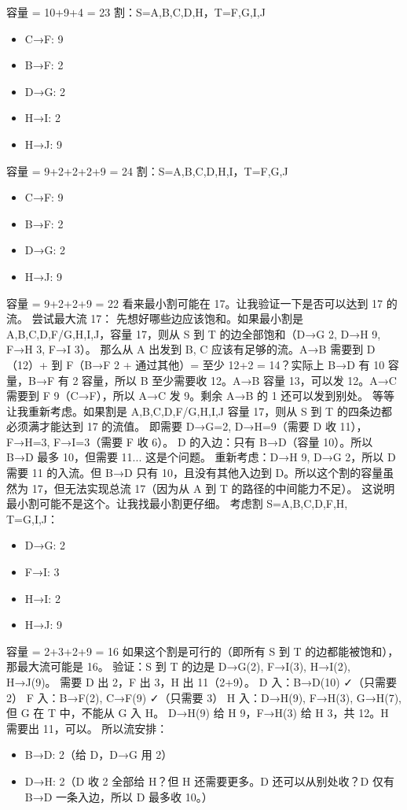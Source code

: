 \documentclass[10pt,a4paper,openany]{ctexbook}
\theoremstyle{definition}
\theoremstyle{remark}
\begin{document}
容量 = 10+9+4 = 23
割：S={A,B,C,D,H}，T={F,G,I,J}
\begin{itemize}
\item C→F: 9
\item B→F: 2
\item D→G: 2
\item H→I: 2
\item H→J: 9
\end{itemize}

容量 = 9+2+2+2+9 = 24
割：S={A,B,C,D,H,I}，T={F,G,J}
\begin{itemize}
\item C→F: 9
\item B→F: 2
\item D→G: 2
\item H→J: 9
\end{itemize}

容量 = 9+2+2+9 = 22
看来最小割可能在 17。让我验证一下是否可以达到 17 的流。
尝试最大流 17：
先想好哪些边应该饱和。如果最小割是 {A,B,C,D,F}/{G,H,I,J}，容量 17，则从 S 到 T 的边全部饱和（D→G 2, D→H 9, F→H 3, F→I 3）。
那么从 A 出发到 B, C 应该有足够的流。A→B 需要到 D（12）+ 到 F（B→F 2 + 通过其他）= 至少 12+2 = 14？实际上 B→D 有 10 容量，B→F 有 2 容量，所以 B 至少需要收 12。A→B 容量 13，可以发 12。A→C 需要到 F 9（C→F），所以 A→C 发 9。剩余 A→B 的 1 还可以发到别处。
等等让我重新考虑。如果割是 {A,B,C,D,F}/{G,H,I,J} 容量 17，则从 S 到 T 的四条边都必须满才能达到 17 的流值。
即需要 D→G=2, D→H=9（需要 D 收 11），F→H=3, F→I=3（需要 F 收 6）。
D 的入边：只有 B→D（容量 10）。所以 B→D 最多 10，但需要 11... 这是个问题。
重新考虑：D→H 9, D→G 2，所以 D 需要 11 的入流。但 B→D 只有 10，且没有其他入边到 D。所以这个割的容量虽然为 17，但无法实现总流 17（因为从 A 到 T 的路径的中间能力不足）。
这说明最小割可能不是这个。让我找最小割更仔细。
考虑割 S={A,B,C,D,F,H}, T={G,I,J}：
\begin{itemize}
\item D→G: 2
\item F→I: 3
\item H→I: 2
\item H→J: 9
\end{itemize}

容量 = 2+3+2+9 = 16
如果这个割是可行的（即所有 S 到 T 的边都能被饱和），那最大流可能是 16。
验证：S 到 T 的边是 D→G(2), F→I(3), H→I(2), H→J(9)。
需要 D 出 2，F 出 3，H 出 11（2+9）。
D 入：B→D(10) ✓（只需要 2）
F 入：B→F(2), C→F(9) ✓（只需要 3）
H 入：D→H(9), F→H(3), G→H(7), 但 G 在 T 中，不能从 G 入 H。
D→H(9) 给 H 9，F→H(3) 给 H 3，共 12。H 需要出 11，可以。
所以流安排：
\begin{itemize}
\item B→D: 2（给 D，D→G 用 2）
\item D→H: 2（D 收 2 全部给 H？但 H 还需要更多。D 还可以从别处收？D 仅有 B→D 一条入边，所以 D 最多收 10。）

\end{itemize}
\end{document}

